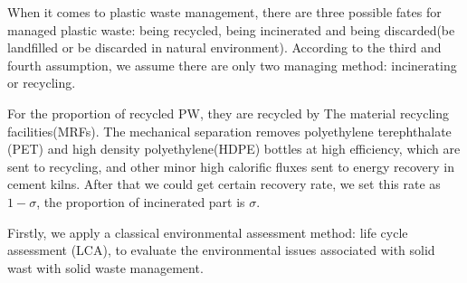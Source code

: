 \documentclass{mcmthesis}
\begin{document}
When it comes to plastic waste management, there are three possible fates for managed plastic waste: being recycled, being incinerated and being discarded(be landfilled or be discarded in natural environment). According to the third and fourth assumption, we assume there are only two managing method: incinerating or recycling.


For the proportion of recycled PW, they are recycled by The material recycling facilities(MRFs). The mechanical separation removes polyethylene terephthalate (PET) and high density polyethylene(HDPE) bottles at high efficiency, which are sent to recycling, and other minor high calorific fluxes sent to energy recovery in cement kilns\cite{Rigamonti}. After that we could get certain recovery rate, we set this rate as $1 - \sigma$, the proportion of incinerated part is $\sigma$.

Firstly, we apply a classical environmental assessment method: life cycle assessment (LCA), to evaluate the environmental issues associated with solid wast with solid waste management\cite{Kirkeby}.

\end{document}
